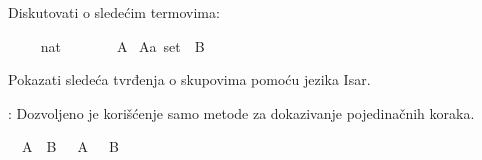 %
\begin{isabellebody}%
%
%
\isadelimtheory
%
\endisadelimtheory
%
\isatagtheory
%
\endisatagtheory
{\isafoldtheory}%
%
\isadelimtheory
%
\endisadelimtheory
%
\begin{exercise}[subtitle=Algebra skupova]
%
\begin{isamarkuptext}%
Diskutovati o sledećim termovima:%
\end{isamarkuptext}\isamarkuptrue%
\isamarkupfalse%
\ {\isachardoublequoteopen}{\isacharbraceleft}{\kern0pt}{}{\isacharcomma}{\kern0pt}\ {}{\isacharcomma}{\kern0pt}\ {}{\isacharbraceright}{\kern0pt}{\isachardoublequoteclose}\isanewline
{}\isamarkupfalse%
\ {\isachardoublequoteopen}{\isacharbraceleft}{\kern0pt}{}{\isacharcolon}{\kern0pt}{\isacharcolon}{\kern0pt}nat{\isacharcomma}{\kern0pt}\ {}{\isacharcomma}{\kern0pt}\ {}{\isacharbraceright}{\kern0pt}{\isachardoublequoteclose}\isanewline
{}\isamarkupfalse%
\ {\isachardoublequoteopen}{\isacharparenleft}{\kern0pt}{\isasymin}{\isacharparenright}{\kern0pt}{\isachardoublequoteclose}\isanewline
{}\isamarkupfalse%
\ {\isachardoublequoteopen}{\isacharparenleft}{\kern0pt}{\isasyminter}{\isacharparenright}{\kern0pt}{\isachardoublequoteclose}\isanewline
{}\isamarkupfalse%
\ {\isachardoublequoteopen}{\isacharparenleft}{\kern0pt}{\isasymunion}{\isacharparenright}{\kern0pt}\ A{\isachardoublequoteclose}\isanewline
{}\isamarkupfalse%
\ {\isachardoublequoteopen}{\isacharparenleft}{\kern0pt}A{\isacharcolon}{\kern0pt}{\isacharcolon}{\kern0pt}{\isacharprime}{\kern0pt}a\ set{\isacharparenright}{\kern0pt}\ {\isacharminus}{\kern0pt}\ B{\isachardoublequoteclose}%
\end{exercise}
%
\begin{exercise}[subtitle=Isar dokazi]
%
\begin{isamarkuptext}%
Pokazati sledeća tvrđenja o skupovima pomoću jezika Isar.%
\end{isamarkuptext}\isamarkuptrue%
%
\begin{isamarkuptext}%
: Dozvoljeno je korišćenje samo  metode za
                  dokazivanje pojedinačnih koraka.%
\end{isamarkuptext}\isamarkuptrue%
\isamarkupfalse%
\ {\isachardoublequoteopen}{\isacharminus}{\kern0pt}\ {\isacharparenleft}{\kern0pt}A\ {\isasymunion}\ B{\isacharparenright}{\kern0pt}\ {\isacharequal}{\kern0pt}\ {\isacharminus}{\kern0pt}\ A\ {\isasyminter}\ {\isacharminus}{\kern0pt}\ B{\isachardoublequoteclose}\isanewline

\end{exercise}
\end{isabellebody}

